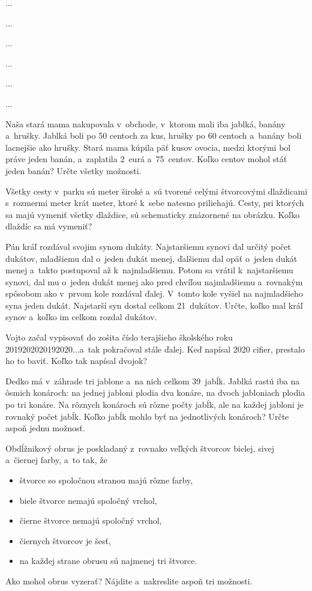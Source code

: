 ﻿{%
...}

{%
...}

{%
...}

{%
...}

{%
...}

{%
...}

{%
Naša stará mama nakupovala v~obchode, v~ktorom mali iba jablká, banány a~hrušky.
Jablká boli po 50 centoch za kus, hrušky po 60 centoch a~banány boli lacnejšie ako hrušky.
Stará mama kúpila päť kusov ovocia, medzi ktorými bol práve jeden banán,
a~zaplatila 2~eurá a~75~centov.
Koľko centov mohol stáť jeden banán?
Určte všetky možnosti.
}

{%
Všetky cesty v~parku sú meter široké a~sú tvorené celými štvorcovými dlaždicami s~rozmermi meter krát meter, ktoré k~sebe natesno priliehajú.
Cesty, pri ktorých sa majú vymeniť všetky dlaždice, sú schematicky znázornené na obrázku.
Koľko dlaždíc sa má vymeniť?
%
}

{%
Pán kráľ rozdával svojim synom dukáty.
Najstaršiemu synovi dal určitý počet dukátov, mladšiemu dal o~jeden dukát menej, ďalšiemu dal opäť o~jeden dukát menej a~takto postupoval až k~najmladšiemu.
Potom sa vrátil k~najstaršiemu synovi, dal mu o~jeden dukát menej ako pred chvíľou najmladšiemu a~rovnakým spôsobom ako v~prvom kole rozdával ďalej.
V~tomto kole vyšiel na najmladšieho syna jeden dukát.
Najstarší syn dostal celkom 21~dukátov.
Určte, koľko mal kráľ synov a~koľko im celkom rozdal dukátov.
}

{%
Vojto začal vypisovať do zošita číslo terajšieho školského roku 2019202020192020...a~tak pokračoval stále ďalej.
Keď napísal 2020 cifier, prestalo ho to baviť.
Koľko tak napísal dvojok?
}

{%
Dedko má v~záhrade tri jablone a~na nich celkom 39~jabĺk.
Jablká rastú iba na ôsmich konároch: na jednej jabloni plodia dva konáre, na dvoch jabloniach plodia po tri konáre.
Na rôznych konároch sú rôzne počty jabĺk, ale na každej jabloni je rovnaký počet jabĺk.
Koľko jabĺk mohlo byť na jednotlivých konároch?
Určte aspoň jednu možnosť.}

{%
Obdĺžnikový obrus je poskladaný z~rovnako veľkých štvorcov bielej, sivej a~čiernej farby, a~to tak, že
\begin{itemize}
\item štvorce so spoločnou stranou majú rôzne farby,
\item biele štvorce nemajú spoločný vrchol,
\item čierne štvorce nemajú spoločný vrchol,
\item čiernych štvorcov je šesť,
\item na každej strane obrusu sú najmenej tri štvorce.
\end{itemize}
\noindent
Ako mohol obrus vyzerať?
Nájdite a~nakreslite aspoň tri možnosti.}

